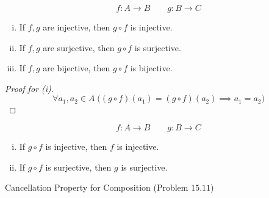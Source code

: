 \begin{frame}{}
  \begin{theorem}
    \[
      f: A \to B \qquad g: B \to C
    \]

    \begin{enumerate}[(i)]
      \item If $f, g$ are injective, then $g \circ f$ is injective.
      \item If $f, g$ are surjective, then $g \circ f$ is surjective.
      \item If $f, g$ are bijective, then $g \circ f$ is bijective.
    \end{enumerate}
  \end{theorem}

  \pause
  \vspace{0.60cm}
  \begin{proof}[Proof for (i)]
    \[
      \forall a_1, a_2 \in A\; \Big( (g \circ f)(a_1) = (g \circ f)(a_2) \implies a_1 = a_2 \Big)
    \]
  \end{proof}
\end{frame}

\begin{frame}{}
  \begin{theorem}
    \[
      f: A \to B \qquad g: B \to C
    \]

    \begin{enumerate}[(i)]
      \item If $g \circ f$ is injective, then $f$ is injective.
      \item If $g \circ f$ is surjective, then $g$ is surjective.
    \end{enumerate}
  \end{theorem}
\end{frame}

\begin{frame}{}
  \begin{exampleblock}{Cancellation Property for Composition (Problem $15.11$)}

  \end{exampleblock}
\end{frame}

\begin{frame}{}
\end{frame}

\begin{frame}{}
\end{frame}
